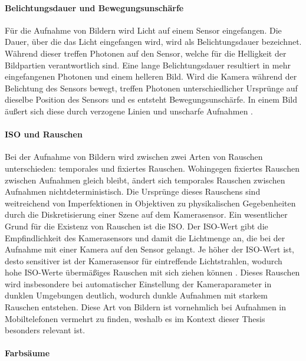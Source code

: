\paragraph{Belichtungsdauer und Bewegungsunschärfe}

Für die Aufnahme von Bildern wird Licht auf einem Sensor eingefangen. Die Dauer, über die das Licht eingefangen wird, wird als Belichtungsdauer bezeichnet. Während dieser treffen Photonen auf den Sensor, welche für die Helligkeit der Bildpartien verantwortlich sind. Eine lange Belichtungsdauer resultiert in mehr eingefangenen Photonen und einem helleren Bild. Wird die Kamera während der Belichtung des Sensors bewegt, treffen Photonen unterschiedlicher Ursprünge auf dieselbe Position des Sensors und es entsteht Bewegungsunschärfe. In einem Bild äußert sich diese durch verzogene Linien und unscharfe Aufnahmen \cite{motion_blur}.

\paragraph{ISO und Rauschen}

Bei der Aufnahme von Bildern wird zwischen zwei Arten von Rauschen unterschieden: temporales und fixiertes Rauschen. Wohingegen fixiertes Rauschen zwischen Aufnahmen gleich bleibt, ändert sich temporales Rauschen zwischen Aufnahmen nichtdeterministisch. Die Ursprünge dieses Rauschens sind weitreichend von Imperfektionen in Objektiven zu physikalischen Gegebenheiten durch die Diskretisierung einer Szene auf dem Kamerasensor. Ein wesentlicher Grund für die Existenz von Rauschen ist die ISO. Der ISO-Wert gibt die Empfindlichkeit des Kamerasensors und damit die Lichtmenge an, die bei der Aufnahme mit einer Kamera auf den Sensor gelangt. Je höher der ISO-Wert ist, desto sensitiver ist der Kamerasensor für eintreffende Lichtstrahlen, wodurch hohe ISO-Werte übermäßiges Rauschen mit sich ziehen können \cite{camera_everything}. Dieses Rauschen wird insbesondere bei automatischer Einstellung der Kameraparameter in dunklen Umgebungen deutlich, wodurch dunkle Aufnahmen mit starkem Rauschen entstehen. Diese Art von Bildern ist vornehmlich bei Aufnahmen in Mobiltelefonen vermehrt zu finden, weshalb es im Kontext dieser Thesis besonders relevant ist.

\paragraph{Farbsäume}


